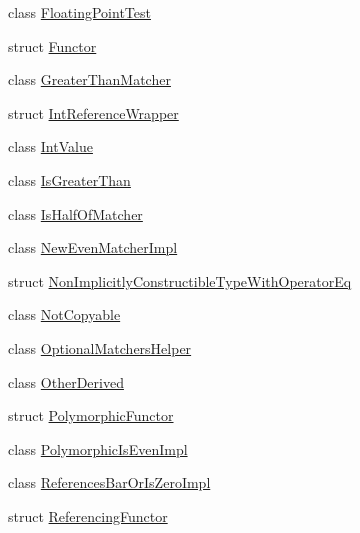 \begin{DoxyCompactItemize}
\item 
class \mbox{\hyperlink{classtesting_1_1gmock__matchers__test_1_1_floating_point_test}{Floating\+Point\+Test}}
\item 
struct \mbox{\hyperlink{structtesting_1_1gmock__matchers__test_1_1_functor}{Functor}}
\item 
class \mbox{\hyperlink{classtesting_1_1gmock__matchers__test_1_1_greater_than_matcher}{Greater\+Than\+Matcher}}
\item 
struct \mbox{\hyperlink{structtesting_1_1gmock__matchers__test_1_1_int_reference_wrapper}{Int\+Reference\+Wrapper}}
\item 
class \mbox{\hyperlink{classtesting_1_1gmock__matchers__test_1_1_int_value}{Int\+Value}}
\item 
class \mbox{\hyperlink{classtesting_1_1gmock__matchers__test_1_1_is_greater_than}{Is\+Greater\+Than}}
\item 
class \mbox{\hyperlink{classtesting_1_1gmock__matchers__test_1_1_is_half_of_matcher}{Is\+Half\+Of\+Matcher}}
\item 
class \mbox{\hyperlink{classtesting_1_1gmock__matchers__test_1_1_new_even_matcher_impl}{New\+Even\+Matcher\+Impl}}
\item 
struct \mbox{\hyperlink{structtesting_1_1gmock__matchers__test_1_1_non_implicitly_constructible_type_with_operator_eq}{Non\+Implicitly\+Constructible\+Type\+With\+Operator\+Eq}}
\item 
class \mbox{\hyperlink{classtesting_1_1gmock__matchers__test_1_1_not_copyable}{Not\+Copyable}}
\item 
class \mbox{\hyperlink{classtesting_1_1gmock__matchers__test_1_1_optional_matchers_helper}{Optional\+Matchers\+Helper}}
\item 
class \mbox{\hyperlink{classtesting_1_1gmock__matchers__test_1_1_other_derived}{Other\+Derived}}
\item 
struct \mbox{\hyperlink{structtesting_1_1gmock__matchers__test_1_1_polymorphic_functor}{Polymorphic\+Functor}}
\item 
class \mbox{\hyperlink{classtesting_1_1gmock__matchers__test_1_1_polymorphic_is_even_impl}{Polymorphic\+Is\+Even\+Impl}}
\item 
class \mbox{\hyperlink{classtesting_1_1gmock__matchers__test_1_1_references_bar_or_is_zero_impl}{References\+Bar\+Or\+Is\+Zero\+Impl}}
\item 
struct \mbox{\hyperlink{structtesting_1_1gmock__matchers__test_1_1_referencing_functor}{Referencing\+Functor}}
\item 

\end{DoxyCompactItemize}
